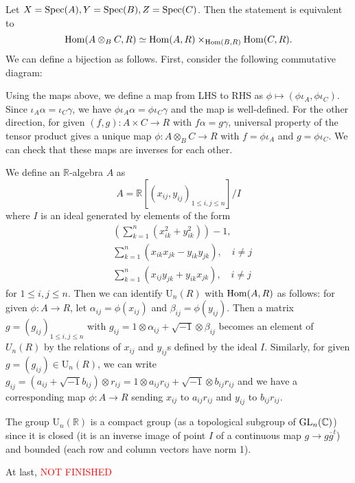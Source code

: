 \begin{problem}
Let $X = \operatorname{\mathrm{Spec}}(A), Y = \operatorname{\mathrm{Spec}}(B), Z = \operatorname{\mathrm{Spec}}(C)$. Then the statement is equivalent to
$$
    \operatorname{\mathrm{Hom}}(A \otimes_{B}C, R) \simeq \operatorname{\mathrm{Hom}}(A, R) \times_{\operatorname{\mathrm{Hom}}(B, R)} \operatorname{\mathrm{Hom}}(C, R).
$$
We can define a bijection as follows. First, consider the following commutative diagram:
\begin{center}
\end{center}
Using the maps above, we define a map from LHS to RHS as $\phi \mapsto (\phi \iota_{A}, \phi\iota_{C})$.
Since $\iota_{A}\alpha = \iota_{C}\gamma$, we have $\phi\iota_{A}\alpha = \phi\iota_{C}\gamma$ and the
map is well-defined.
For the other direction, for given $(f, g): A\times C \to R$ with $f\alpha = g \gamma$, universal property of the tensor product
gives a unique map $\phi: A\otimes_{B} C \to R$ with $f = \phi\iota_{A}$ and $g = \phi\iota_{C}$.
We can check that these maps are inverses for each other.
\end{problem}

\begin{problem} \notfinish
\end{problem}

\begin{problem} \notfinish
We define an $\mathbb{R}$-algebra $A$ as
$$
    A = \mathbb{R}[(x_{ij}, y_{ij})_{1 \leq i, j \leq n}] / I
$$
where $I$ is an ideal generated by elements of the form
\begin{align*}
    &\left(\sum_{k=1}^{n} (x_{ik}^{2} + y_{ik}^{2}) \right) - 1, \\
    &\sum_{k=1}^{n} (x_{ik}x_{jk} - y_{ik}y_{jk}), \quad i \neq j \\
    &\sum_{k=1}^{n} (x_{ij}y_{jk} + y_{ik}x_{jk}), \quad i \neq j
\end{align*}
for $1\leq i, j \leq n$.
Then we can identify $\mathrm{U}_{n}(R)$ with $\operatorname{\mathrm{Hom}}(A, R)$ as follows: for given $\phi : A \to R$,
let $\alpha_{ij} = \phi(x_{ij})$ and $\beta_{ij} = \phi(y_{ij})$.
Then a matrix $g = (g_{ij})_{1\leq i, j \leq n}$ with $g_{ij} = 1 \otimes \alpha_{ij} + \sqrt{-1} \otimes \beta_{ij}$ becomes an element
of $U_{n}(R)$ by the relations of $x_{ij}$ and $y_{ij}$s defined by the ideal $I$.
Similarly, for given $g = (g_{ij}) \in \mathrm{U}_{n}(R)$, we can write $g_{ij} = (a_{ij} + \sqrt{-1}b_{ij}) \otimes r_{ij} = 1 \otimes a_{ij}r_{ij} + \sqrt{-1} \otimes b_{ij}r_{ij}$
and we have a corresponding map $\phi : A \to R$ sending $x_{ij}$ to $a_{ij}r_{ij}$ and $y_{ij}$ to $b_{ij}r_{ij}$.

The group $\mathrm{U}_n(\mathbb{R})$ is a compact group (as a topological subgroup of $\operatorname{\mathrm{GL}}_{n}(\mathbb{C})$)
since it is closed (it is an inverse image of point $I$ of a continuous map $g \to g \overline{g}^{t}$) and bounded (each row and column vectors have norm 1).

At last, \textcolor{red}{NOT FINISHED}
\end{problem}

